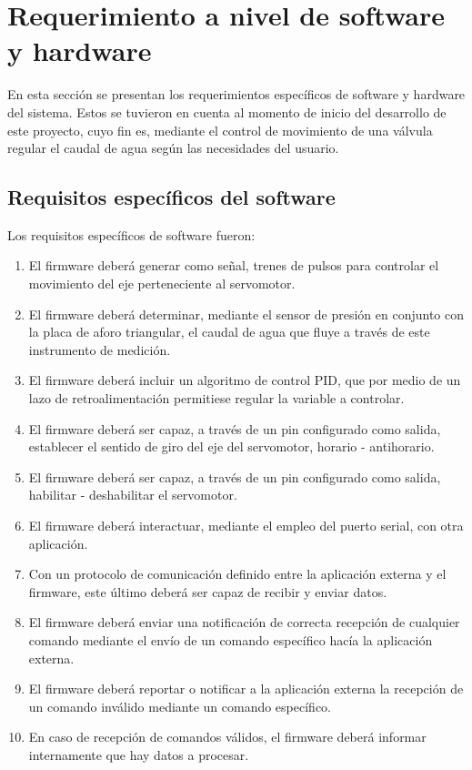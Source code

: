 \section{Requerimiento a nivel de software y hardware}
\label{sec:ejemplo}
En esta sección se presentan los requerimientos específicos de software y hardware del sistema. Estos se tuvieron en cuenta al momento de inicio del desarrollo de este proyecto, cuyo fin es, mediante el control de movimiento de una válvula regular el caudal de agua según las necesidades del usuario. 
\subsection{Requisitos específicos del software}
\label{subsec:ejemplo}


 Los requisitos específicos de software fueron:

\begin{enumerate}
	\item El firmware deberá generar como señal, trenes de pulsos para controlar el movimiento del eje perteneciente al servomotor.
	\item El firmware deberá determinar, mediante el sensor de presión en conjunto con la placa de aforo triangular, el caudal de agua que fluye a través de este instrumento de medición.
	\item  El firmware deberá incluir un algoritmo de control PID, que por medio de un lazo de retroalimentación permitiese regular la variable a controlar.
	\item El firmware deberá ser capaz, a través de un pin configurado como salida, establecer el sentido de giro del eje del servomotor, horario - antihorario.
	\item El firmware deberá ser capaz, a través de un pin configurado como salida, habilitar - deshabilitar el servomotor.
	\item El firmware deberá interactuar, mediante el empleo del puerto serial, con otra aplicación. 	  
	\item Con un protocolo de comunicación definido entre la aplicación externa y el firmware, este último deberá ser capaz de recibir y enviar datos.
	\item El firmware deberá enviar una notificación de correcta recepción de cualquier comando mediante el envío de un comando específico hacía la aplicación externa.  
	\item El firmware deberá reportar o notificar a la aplicación externa la recepción de un comando inválido mediante un comando específico.
	\item En caso de recepción de comandos válidos, el firmware deberá informar internamente que hay datos a procesar. 
\end{enumerate}

